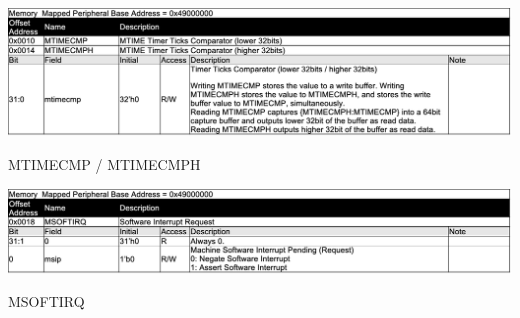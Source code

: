 \begin{table}[H]
    \includegraphics[width=1.00\columnwidth]{./Table/MTIME_CMP.png}
    \caption{MTIMECMP / MTIMECMPH}
    \label{tb:MTIME_CMP}
\end{table}

\begin{table}[H]
    \includegraphics[width=1.00\columnwidth]{./Table/MSOFTIRQ.png}
    \caption{MSOFTIRQ}
    \label{tb:MSOFTIRQ}
\end{table}


